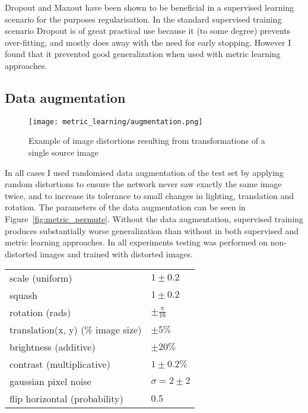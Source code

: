 Dropout and Maxout have been shown to be beneficial in a supervised learning scenario for the purposes regularisation. In the standard supervised training scenario Dropout is of great practical use because it (to some degree) prevents over-fitting, and mostly does away with the need for early stopping. However I found that it prevented good generalization when used with metric learning approaches.

\subsection {Data augmentation}

\begin{figure}[h]
\centering
\texttt{[image: metric\_learning/augmentation.png]}
\caption{Example of image distortions resulting from transformations of a single source image}
\label{fig:metric_augmentation}
\end{figure}


In all cases I used randomised data augmentation of the test set by applying random distortions to ensure the network never saw exactly the same image twice, and to increase its tolerance to small changes in lighting, translation and rotation. The parameters of the data augmentation can be seen in Figure~\ref{fig:metric_permute}. Without the data augmentation, supervised training produces substantially worse generalization than without in both supervised and metric learning approaches. In all experiments testing was performed on non-distorted images and trained with distorted images.

\begin{table*}
  \centering
    \caption{Ranges of parameters used for image distortion }

  \begin{tabular}{ l  l }
    \toprule
    scale (uniform) & $ 1 \pm 0.2 $  \\ 
    squash  & $ 1 \pm 0.2 $  \\ 
    rotation (rads) & $ \pm \frac{\pi}{16} $ \\ 
    translation(x, y) (\% image size) & $ \pm 5 \% $ \\ 
    brightness (additive) & $ \pm 20 \% $ \\ 
    contrast (multiplicative) & $ 1 \pm 0.2 \% $ \\ 
    gaussian pixel noise & $ \sigma = 2 \pm 2 $  \\ 
    flip horizontal (probability) & $ 0.5 $ \\ 
    \bottomrule
  \end{tabular}
\label{fig:metric_permute}
\end{table*}

